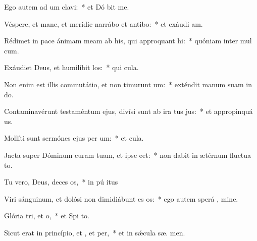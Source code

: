 \item Ego autem ad um clavi:~* et Dó bit me.
\item Véspere, et mane, et merídie narrábo et antibo:~* et exáudi  am.
\item Rédimet in pace ánimam meam ab his, qui approquant hi:~* quóniam inter mul  cum.
\item Exáudiet Deus, et humilibit los:~* qui   cula.
\item Non enim est illis commutátio, et non timurunt um:~* exténdit manum suam in do.
\item Contaminavérunt testaméntum ejus, divísi sunt ab ira tus jus:~* et appropinquá  us.
\item Mollíti sunt sermónes ejus per um:~* et   cula.
\item Jacta super Dóminum curam tuam, et ipse  eet:~* non dabit in ætérnum fluctua to.
\item Tu vero, Deus, deces os,~* in pú itus
\item Viri sánguinum, et dolósi non dimidiábunt es os:~* ego autem sperá  , mine.
\item Glória tri, et o,~* et Spi to.
\item Sicut erat in princípio, et , et per,~* et in sǽcula sæ. men.
